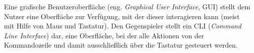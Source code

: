 
Eine grafische Benutzeroberfläche (eng. \textit{Graphical User Interface}, GUI) stellt dem Nutzer eine Oberfläche zur Verfügung, mit der dieser interagieren kann (meist mit Hilfe von Maus und Tastatur). Den Gegenspieler stellt ein CLI (\textit{Command Line Interface}) dar, eine Oberfläche, bei der alle Aktionen von der Kommandozeile und damit ausschließlich über die Tastatur gesteuert werden.